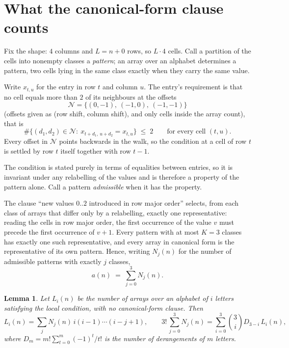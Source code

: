 \documentclass[11pt,a4paper]{article}
\theoremstyle{plain}
\newtheorem{lemma}[theorem]{Lemma}
\theoremstyle{definition}
\begin{document}
\section{What the canonical-form clause counts}

Fix the shape: $4$ columns and $L=n+0$ rows, so $L\cdot4$ cells. Call a
partition of the cells into nonempty classes a \emph{pattern}; an array over an alphabet
determines a pattern, two cells lying in the same class exactly when they carry the same
value.

Write $x_{t,u}$ for the entry in row $t$ and column $u$. The
entry's requirement is that no cell equals more than $2$ of its neighbours at the
offsets
\[
\mathcal N=\{(0,-1),\ (-1,0),\ (-1,-1)\}
\]
(offsets given as (row shift, column shift), and only cells inside the array count),
that is
\begin{equation}\label{eq:loc}
\#\bigl\{(d_1,d_2)\in\mathcal N:\ x_{t+d_1,\,u+d_2}=x_{t,u}\bigr\}\;\le\;2
\qquad\text{for every cell }(t,u).
\end{equation}
Every offset in $\mathcal N$ points backwards in the walk, so the condition at a cell of
row $t$ is settled by row $t$ itself together with row $t-1$.

The condition is stated purely in terms of equalities between entries, so it is invariant
under any relabelling of the values and is therefore a property of the pattern alone. Call a
pattern \emph{admissible} when it has the property.

The clause ``new values $0..2$ introduced in row major order'' selects, from each class
of arrays that differ only by a relabelling, exactly one representative: reading the cells in
row major order, the first occurrence of the value $v$ must precede the first occurrence of
$v+1$. Every pattern with at most $K=3$ classes has exactly one such representative, and
every array in canonical form is the representative of its own pattern. Hence, writing
$N_j(n)$ for the number of admissible patterns with exactly $j$ classes,
\begin{equation}\label{eq:apat}
a(n)\;=\;\sum_{j=0}^{3}N_j(n).
\end{equation}

\begin{lemma}\label{lem:inv}
Let $L_i(n)$ be the number of arrays over an alphabet of $i$ letters satisfying the local
condition, with no canonical-form clause. Then
\[
L_i(n)=\sum_j N_j(n)\,i(i-1)\cdots(i-j+1),
\qquad
3!\,\sum_{j=0}^{3}N_j(n)=\sum_{i=0}^{3}\binom{3}{i}D_{3-i}\,L_i(n),
\]
where $D_m=m!\sum_{t=0}^{m}(-1)^t/t!$ is the number of derangements of $m$ letters.
\end{lemma}
\end{document}
